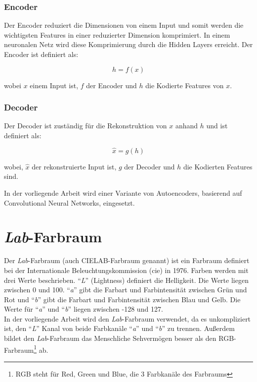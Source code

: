 \subsubsection{Encoder}
Der Encoder reduziert die Dimensionen von einem Input und somit werden die wichtigsten Features in einer reduzierter Dimension komprimiert.
In einem neuronalen Netz wird diese Komprimierung durch die Hidden Layers erreicht. Der Encoder ist definiert als:

\begin{equation}
  h = f(x)
\end{equation}

wobei $x$ einem Input ist, $f$ der Encoder und $h$ die Kodierte Features von $x$.

\subsubsection{Decoder}
Der Decoder ist zuständig für die Rekonstruktion von $x$ anhand $h$ und ist definiert als:

\begin{equation}
  \hat{x} = g(h)
\end{equation}

wobei, $\hat{x}$ der rekonstruierte Input ist, $g$ der Decoder und $h$ die Kodierten Features sind.

In der vorliegende Arbeit wird einer Variante von Autoencoders, basierend auf Convolutional Neural Networks, eingesetzt.

\section{\textit{Lab}-Farbraum} 
Der \textit{Lab}-Farbraum (auch CIELAB-Farbraum genannt) ist ein Farbraum definiert bei der Internationale
Beleuchtungskommission (\gls{cie}) in 1976. Farben werden mit drei Werte beschrieben. ``\textit{L}'' (Lightness) definiert die Helligkeit.
Die Werte liegen zwischen 0 und 100. ``\textit{a}'' gibt die Farbart und Farbintensität zwischen Grün und Rot und ``\textit{b}'' gibt die
Farbart und Farbintensität zwischen Blau und Gelb. Die Werte für ``\textit{a}'' und ``\textit{b}'' liegen zwischen -128 und 127.
\\
In der vorliegende Arbeit wird den \textit{Lab}-Farbraum verwendet, da es unkompliziert ist, den ``\textit{L}'' Kanal von beide Farbkanäle 
``\textit{a}'' und ``\textit{b}'' zu trennen. Außerdem bildet den \textit{Lab}-Farbraum das Menschliche Sehvermögen besser als den 
RGB-Farbraum\footnote{RGB steht für Red, Green und Blue, die 3 Farbkanäle des Farbraums} ab.


